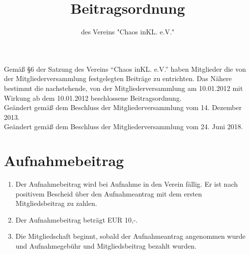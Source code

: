 \documentclass[a4paper, 12pt]{scrartcl}
\begin{document}
\title{Beitragsordnung}
\subtitle{des Vereins "Chaos inKL. e.V."}
\author{}
\date{}

\maketitle

\noindent Gemäß §6 der Satzung des Vereins "`Chaos inKL. e.V."'
haben Mitglieder die von der Mitgliederversammlung
festgelegten Beiträge zu entrichten. Das Nähere bestimmt die
nachstehende, von der Mitgliederversammlung am 10.01.2012 mit Wirkung ab
dem 10.01.2012 beschlossene Beitragsordnung. \\[0.5cm]
Geändert gemäß dem Beschluss der Mitgliederversammlung vom 14. Dezember 2013. \\
Geändert gemäß dem Beschluss der Mitgliederversammlung vom 24. Juni 2018.


\section{Aufnahmebeitrag}
\begin{enumerate}
	\item Der Aufnahmebeitrag wird bei Aufnahme in den Verein fällig. Er ist nach positivem Bescheid über den Aufnahmeantrag mit dem ersten Mitgliedsbeitrag zu zahlen.
	\item Der Aufnahmebeitrag beträgt EUR 10,-.
	\item Die Mitgliedschaft beginnt, sobald der Aufnahmeantrag angenommen wurde und Aufnahmegebühr und Mitgliedsbeitrag bezahlt wurden.
\end{enumerate}
\end{document}
